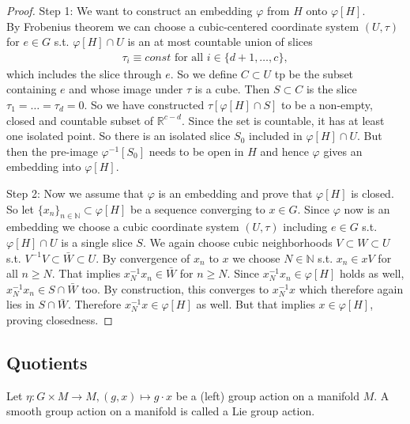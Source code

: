 \begin{proof}
Step 1: We want to construct an embedding $\varphi$ from $H$ onto $\varphi[H]$.\\
By Frobenius theorem we can choose a cubic-centered coordinate system $(U,\tau)$ for $e \in G$ s.t. $\varphi[H]\cap U$ is an at most countable union of slices 
\begin{align*}
\tau_i \equiv const \text{ for all } i \in \{d+1,\dots,c\},
\end{align*} 
which includes the slice through $e$. So we define $C \subset U$ tp be the subset containing $e$ and whose image under $\tau$ is a cube. Then $S \subset C$ is the slice $\tau_1 = \dots = \tau_d = 0$. So we have constructed $\tau[\varphi[H]\cap S]$ to be a non-empty, closed and countable subset of $\mathbb{R}^{c-d}$. Since the set is countable, it has at least one isolated point. So there is an isolated slice $S_0$ included in $\varphi[H]\cap U$. But then the pre-image $\varphi^{-1}[S_0]$ needs to be open in $H$ and hence $\varphi$ gives an embedding into $\varphi[H]$.


Step 2: Now we assume that $\varphi$ is an embedding and prove that $\varphi[H]$ is closed. \\
So let $\{x_n\}_{n \in \mathbb{N}} \subset \varphi[H]$ be a sequence converging to $x \in G$. Since $\varphi$ now is an embedding we choose a cubic coordinate system $(U,\tau)$ including $e \in G$ s.t. $\varphi[H] \cap U$ is a single slice $S$. We again choose cubic neighborhoods $V \subset W \subset U$ s.t. $V^{-1}V \subset \bar{W} \subset U$. By convergence of $x_n$ to $x$ we choose $N \in \mathbb{N}$ s.t. $x_n \in xV$ for all $n \geq N$. That implies $x_N^{-1}x_n \in \bar{W}$ for $n \geq N$. Since $x_N^{-1}x_n \in \varphi[H]$ holds as well, $x_N^{-1}x_n \in S \cap \bar{W}$ too. By construction, this converges to $x_N^{-1}x$ which therefore again lies in $S \cap \bar{W}$. Therefore $x_N^{-1}x \in \varphi[H]$ as well. But that implies $x \in \varphi[H]$, proving closedness.

\end{proof}

\subsection{Quotients}
\begin{definition}
Let $\eta \colon G \times M \to M, (g,x) \mapsto g \cdot x$ be a (left) group action on a manifold $M$. A smooth group action on a manifold is called a Lie group action.
\end{definition}


